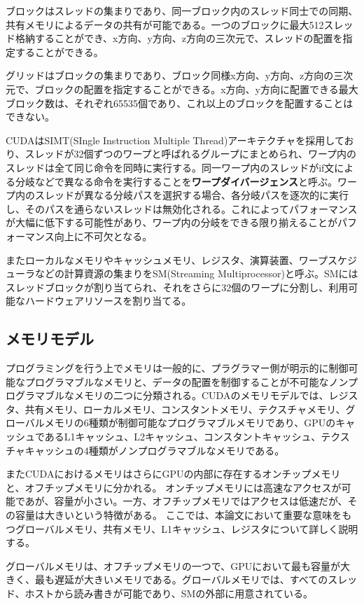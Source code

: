 \documentclass[a4paper,11pt,oneside,openany]{jsbook}
\begin{document}
ブロックはスレッドの集まりであり、同一ブロック内のスレッド同士での同期、共有メモリによるデータの共有が可能である。一つのブロックに最大512スレッド格納することができ、x方向、y方向、z方向の三次元で、スレッドの配置を指定することができる。

グリッドはブロックの集まりであり、ブロック同様x方向、y方向、z方向の三次元で、ブロックの配置を指定することができる。x方向、y方向に配置できる最大ブロック数は、それぞれ65535個であり、これ以上のブロックを配置することはできない。

CUDAはSIMT(SIngle Instruction Multiple Thread)アーキテクチャを採用しており、スレッドが32個ずつのワープと呼ばれるグループにまとめられ、ワープ内のスレッドは全て同じ命令を同時に実行する。同一ワープ内のスレッドがif文による分岐などで異なる命令を実行することを{\bf ワープダイバージェンス}と呼ぶ。ワープ内のスレッドが異なる分岐パスを選択する場合、各分岐パスを逐次的に実行し、そのパスを通らないスレッドは無効化される。これによってパフォーマンスが大幅に低下する可能性があり、ワープ内の分岐をできる限り揃えることがパフォーマンス向上に不可欠となる。

またローカルなメモリやキャッシュメモリ、レジスタ、演算装置、ワープスケジューラなどの計算資源の集まりをSM(Streaming Multiprocessor)と呼ぶ。SMにはスレッドブロックが割り当てられ、それをさらに32個のワープに分割し、利用可能なハードウェアリソースを割り当てる。

\subsection{メモリモデル}
プログラミングを行う上でメモリは一般的に、プラグラマー側が明示的に制御可能なプログラマブルなメモリと、データの配置を制御することが不可能なノンプログラマブルなメモリの二つに分類される。CUDAのメモリモデルでは、レジスタ、共有メモリ、ローカルメモリ、コンスタントメモリ、テクスチャメモリ、グローバルメモリの6種類が制御可能なプログラマブルメモリであり、GPUのキャッシュであるL1キャッシュ、L2キャッシュ、コンスタントキャッシュ、テクスチャキャッシュの4種類がノンプログラマブルなメモリである。

またCUDAにおけるメモリはさらにGPUの内部に存在するオンチップメモリと、オフチップメモリに分かれる。
オンチップメモリには高速なアクセスが可能であが、容量が小さい。一方、オフチップメモリではアクセスは低速だが、その容量は大きいという特徴がある。
ここでは、本論文において重要な意味をもつグローバルメモリ、共有メモリ、L1キャッシュ、レジスタについて詳しく説明する。

グローバルメモリは、オフチップメモリの一つで、GPUにおいて最も容量が大きく、最も遅延が大きいメモリである。グローバルメモリでは、すべてのスレッド、ホストから読み書きが可能であり、SMの外部に用意されている。
\end{document}
